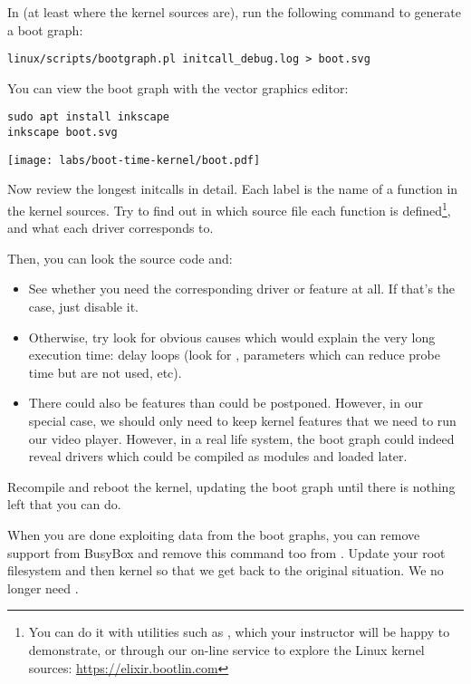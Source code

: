 In  (at least where the kernel sources
are), run the following command to generate a boot graph:

\begin{verbatim}
linux/scripts/bootgraph.pl initcall_debug.log > boot.svg
\end{verbatim}

You can view the boot graph with the  vector graphics
editor:

\begin{verbatim}
sudo apt install inkscape
inkscape boot.svg
\end{verbatim}

\begin{center}
\texttt{[image: labs/boot-time-kernel/boot.pdf]}
\end{center}

Now review the longest initcalls in detail. Each label is the name of
a function in the kernel sources. Try to find out in which source file
each function is defined\footnote{You can do it with utilities such as
, which your instructor will be happy to demonstrate,
or through our on-line service to explore the Linux kernel sources:
\url{https://elixir.bootlin.com}}, and what each driver corresponds
to.

Then, you can look the source code and:
\begin{itemize}
\item See whether you need the corresponding driver or feature at all.
If that's the case, just disable it.
\item Otherwise, try look for obvious causes which
would explain the very long execution time: delay loops (look for
, parameters which can reduce probe time but are not used,
etc).
\item There could also be features than could be postponed.
However, in our special case, we should
only need to keep kernel features that we need to run our video player.
However, in a real life system, the boot graph could indeed reveal
drivers which could be compiled as modules and loaded later.
\end{itemize}

Recompile and reboot the kernel, updating the boot graph until there is
nothing left that you can do.

When you are done exploiting data from the boot graphs, you can remove
 support from BusyBox and remove this command too
from . Update your root filesystem and then kernel so
that we get back to the original situation. We no longer need
.


